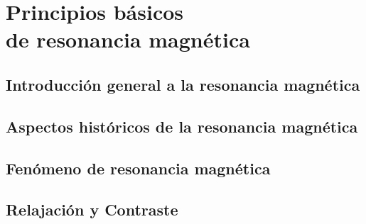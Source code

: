 \documentclass[]{memoir}          %
\begin{document}
\titleTH
\newpage

\frontmatter
\tableofcontents













\mainmatter
\pagestyle{companion}


\part{Principios básicos\\de resonancia magnética}
\label{part_principiosBasicos}


\chapter{Introducción general a la resonancia magnética}
\label{chapter_introGeneral}



\chapter{Aspectos históricos de la resonancia magnética}
\label{chapter_historia}



\chapter{Fenómeno de resonancia magnética}
\label{chapter_fenomeno}



\chapter{Relajación y Contraste}
\label{chapter_relajacion}

\end{document}
